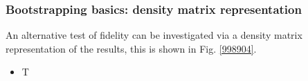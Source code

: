\subsubsection{Bootstrapping basics: density matrix representation}

An alternative test of fidelity can be investigated via a density matrix representation of the results, this is shown in Fig. \ref{998904}.

\begin{itemize}
\item T
\end{itemize}